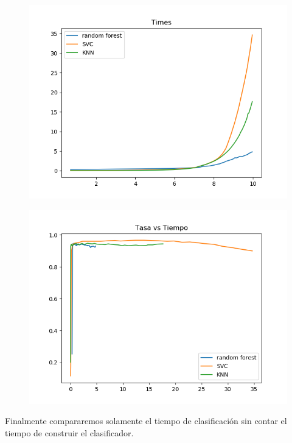 \documentclass[8pt,a4paper]{article}
\begin{document}
\begin{figure}[h]
\centering
\begin{minipage}{.5\textwidth}
  \centering
  \includegraphics[width=1\linewidth]{./CompararTiempos.png}
  \label{fig:test1}
\end{minipage}%
\begin{minipage}{.5\textwidth}
  \centering
  \includegraphics[width=1\linewidth]{./CompararAciertosvsTiempos.png}
  \label{fig:test2}
\end{minipage}
\end{figure}


Finalmente compararemos solamente el tiempo de clasificación sin contar el tiempo de construir el clasificador.
\end{document}
